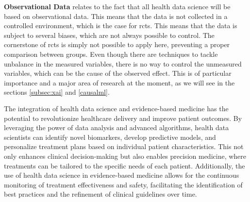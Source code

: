 \textbf{Observational Data} relates to the fact that all health data science will be based on observational data. This means that the data is not collected in a controlled environment, which is the case for \acp{rct}. This means that the data is subject to several biases, which are not always possible to control. The cornerstone of \acp{rct} is simply not possible to apply here, preventing a proper comparison between groups. Even though there are techniques to tackle unbalance in the measured variables, there is no way to control the unmeasured variables, which can be the cause of the observed effect. This is of particular importance and a major area of research at the moment, as we will see in the sections \ref{subsec:xai} and \ref{causalml}.


The integration of health data science and evidence-based medicine has the potential to revolutionize healthcare delivery and improve patient outcomes. By leveraging the power of data analysis and advanced algorithms, health data scientists can identify novel biomarkers, develop predictive models, and personalize treatment plans based on individual patient characteristics. This not only enhances clinical decision-making but also enables precision medicine, where treatments can be tailored to the specific needs of each patient. Additionally, the use of health data science in evidence-based medicine allows for the continuous monitoring of treatment effectiveness and safety, facilitating the identification of best practices and the refinement of clinical guidelines over time.





